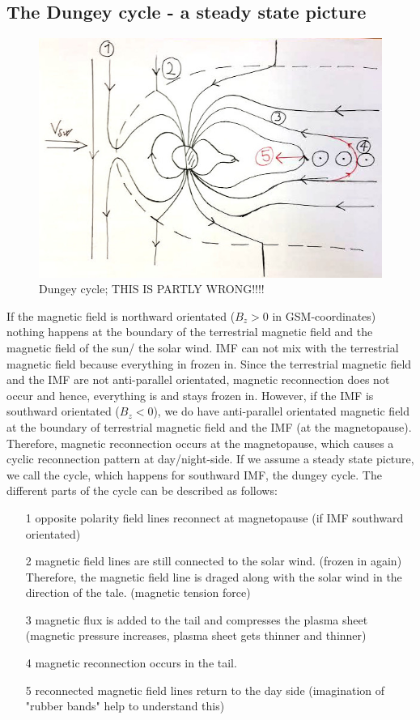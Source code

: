 \documentclass[10pt,a4paper]{article}
\begin{document}
\subsection{The Dungey cycle - a steady state picture \label{_CHAP_THEO_Dungey cycle}}

\begin{figure}[h]
\centering
\caption{Dungey cycle; THIS IS PARTLY WRONG!!!!}
\label{aurora substorm}
\includegraphics[scale=0.5]{solvind.jpg}
\end{figure}

If the magnetic field is northward orientated ($B_z>0$ in GSM-coordinates) nothing happens at the boundary of the terrestrial magnetic field and the magnetic field of the sun/ the solar wind. IMF can not mix with the terrestrial magnetic field because everything in frozen in. Since the terrestrial magnetic field and the IMF are not anti-parallel orientated, magnetic reconnection does not occur and hence, everything is and stays frozen in. 
However, if the IMF is southward orientated ($B_z<0$), we do have anti-parallel orientated magnetic field at the boundary of terrestrial magnetic field and the IMF (at the magnetopause). Therefore, magnetic reconnection occurs at the magnetopause, which causes a cyclic reconnection pattern at day/night-side. If we assume a steady state picture, we call the cycle, which happens for southward IMF, the dungey cycle. The different parts of the cycle can be described as follows:
\begin{itemize}
\item[1] opposite polarity field lines reconnect at magnetopause (if IMF southward orientated)
\item[2] magnetic field lines are still connected to the solar wind. (frozen in again) Therefore, the magnetic field line is draged along with the solar wind in the direction of the tale. (magnetic tension force)
\item[3] magnetic flux is added to the tail and compresses the plasma sheet (magnetic pressure increases, plasma sheet gets thinner and thinner)
\item[4] magnetic reconnection occurs in the tail. 
\item[5] reconnected magnetic field lines return to the day side (imagination of "rubber bands" help to understand this)
\end{itemize}
\end{document}
